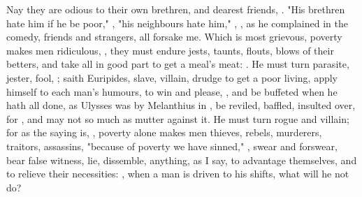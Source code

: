 Nay they are odious to their own brethren, and dearest friends, . "His brethren hate him if he be poor,"
, "his neighbours hate him," , , as he
complained in the comedy, friends and strangers, all forsake me. Which is most
grievous, poverty makes men ridiculous, , they must endure
jests, taunts, flouts, blows of their betters, and take
all in good part to get a meal's meat: . He must turn parasite,
jester, fool, ; saith
Euripides, slave, villain, drudge to get a poor living,
apply himself to each man's humours, to win and please, \etc{}, and be buffeted
when he hath all done, as Ulysses was by Melanthius in
\Homer{}, be reviled, baffled, insulted over, for
, and may not so
much as mutter against it. He must turn rogue and villain; for as the saying
is, , poverty alone makes men thieves, rebels,
murderers, traitors, assassins, "because of poverty we have sinned,"
, swear and forswear, bear false witness, lie,
dissemble, anything, as I say, to advantage themselves, and to relieve their
necessities: , when a
man is driven to his shifts, what will he not do?

